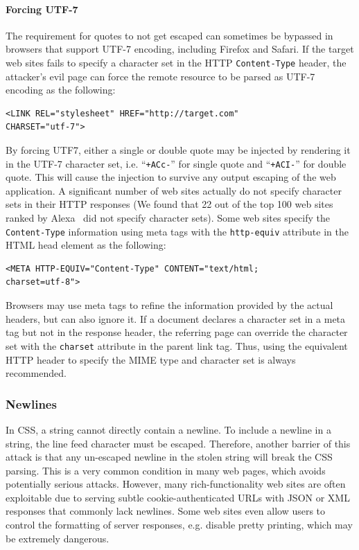 \documentclass{acm_proc_article-sp}
\begin{document}
\paragraph{Forcing UTF-7}
The requirement for quotes to not get escaped can sometimes be bypassed in browsers that support UTF-7 encoding, including Firefox and Safari. If the target web sites fails to specify a character set in the HTTP \texttt{Content-Type} header, the attacker's evil page can force the remote resource to be parsed as UTF-7 encoding as the following:
\begin{verbatim}
<LINK REL="stylesheet" HREF="http://target.com"
CHARSET="utf-7">
\end{verbatim}
By forcing UTF7, either a single or double quote may be injected by rendering it in the UTF-7 character set, i.e. ``\texttt{+ACc-}'' for single quote and ``\texttt{+ACI-}'' for double quote. This will cause the injection to survive any output escaping of the web application. A significant number of web sites actually do not specify character sets in their HTTP responses (We found that 22 out of the top 100 web sites ranked by Alexa~\cite{alexa} did not specify character sets). Some web sites specify the \texttt{Content-Type} information using meta tags with the \texttt{http-equiv} attribute in the HTML head element as the following:
\begin{verbatim}
<META HTTP-EQUIV="Content-Type" CONTENT="text/html;
charset=utf-8">
\end{verbatim}
Browsers may use meta tags to refine the information provided by the actual headers, but can also ignore it. If a document declares a character set in a meta tag but not in the response header, the referring page can override the character set with the \texttt{charset} attribute in the parent link tag. Thus, using the equivalent HTTP header to specify the MIME type and character set is always recommended.

\subsubsection{Newlines}
In CSS, a string cannot directly contain a newline. To include a newline in a string, the line feed character must be escaped. Therefore, another barrier of this attack is that any un-escaped newline in the stolen string will break the CSS parsing. This is a very common condition in many web pages, which avoids potentially serious attacks. However, many rich-functionality web sites are often exploitable due to serving subtle cookie-authenticated URLs with JSON or XML responses that commonly lack newlines. Some web sites even allow users to control the formatting of server responses, e.g. disable pretty printing, which may be extremely dangerous.
\end{document}

